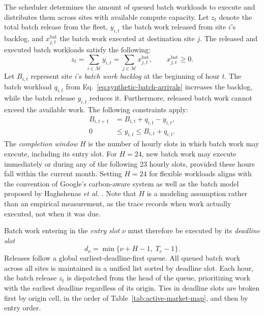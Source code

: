 \documentclass{UNCC-thesis}
\begin{document}
The scheduler determines the amount of queued batch workloads to execute and
distributes them across sites with available compute capacity. Let \(z_t\) denote the
total batch release from the fleet, \(y_{i,t}\) the batch work released from site
\(i\)'s backlog, and \(x^{\mathrm{bat}}_{j,t}\) the batch work executed at destination
site \(j\). The released and executed batch workloads satisfy the following:
\begin{equation}
  z_t
  =
  \sum_{i\in\mathcal M}y_{i,t}
  =
  \sum_{j\in\mathcal M}x^{\mathrm{bat}}_{j,t},
  \qquad
  x^{\mathrm{bat}}_{j,t}\geq0.
  \label{eq:batch-total}
\end{equation}
Let \(B_{i,t}\) represent site \(i\)'s \emph{batch work backlog} at the beginning of
hour \(t\). The batch workload \(q_{i,t}\) from
Eq.~\eqref{eq:synthetic-batch-arrivals} increases the backlog, while the batch
release \(y_{i,t}\) reduces it. Furthermore, released batch work cannot exceed the
available work. The following constraints apply:
\begin{align}
  B_{i,t+1}
  &=
  B_{i,t}+q_{i,t}-y_{i,t},
  \label{eq:queue-balance}\\
  0
  &\leq y_{i,t}\leq B_{i,t}+q_{i,t}.
  \label{eq:queue-availability}
\end{align}
The \emph{completion window} \(H\) is the number of hourly slots in which batch work
may execute, including its entry slot. For \(H=24\), new batch work may execute
immediately or during any of the following 23 hourly slots, provided these hours fall
within the current month. Setting \(H=24\) for flexible workloads aligns with the
convention of Google's carbon-aware system \cite{radovanovic2021carbonaware} as well
as the batch model proposed by Haghshenas \emph{et al.}
\cite{haghshenas2022infrastructure}. Note that \(H\) is a modeling assumption rather
than an empirical measurement, as the trace records when work actually executed, not
when it was due.

Batch work entering in the \emph{entry slot} \(\nu\) must therefore be executed by its
\emph{deadline slot}
\begin{equation}
  d_{\nu}
  =
  \min\{\nu+H-1,\;T_e-1\}.
  \label{eq:batch-deadline}
\end{equation}
Releases follow a global earliest-deadline-first queue. All queued batch work across
all sites is maintained in a unified list sorted by deadline slot. Each hour, the
batch release \(z_t\) is dispatched from the head of the queue, prioritizing work with
the earliest deadline regardless of its origin. Ties in deadline slots are broken
first by origin cell, in the order of Table~\ref{tab:active-market-map}, and then by entry order.
\end{document}
